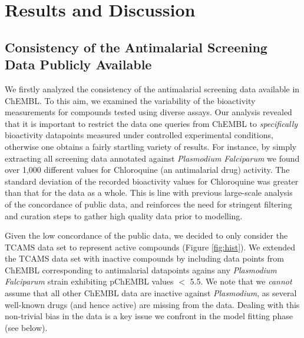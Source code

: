 \documentclass[journal=jacsat,manuscript=article]{achemso}
\begin{document}
\section*{Results and Discussion}

\subsection*{Consistency of the Antimalarial Screening Data Publicly Available}

We firstly analyzed the consistency of the antimalarial screening data available in ChEMBL. To this aim, we examined the variability of the bioactivity measurements for compounds tested using diverse assays. Our analysis revealed that it is important to restrict the data one queries from ChEMBL to \textit{specifically} bioactivity datapoints measured  under controlled experimental conditions, otherwise one obtains a fairly startling variety of results. For instance, by simply extracting all screening data annotated against \textit{Plasmodium Falciparum} we found over 1,000 different values for Chloroquine (an antimalarial drug) activity. The standard deviation of the recorded bioactivity values for Chloroquine was greater than that for the data as a whole. This is line with previous large-scale analysis of the concordance of public data\cite{Kalliokoski2013,Kalliokoski2013B,Cortes-Ciriano2015}, and reinforces the need for stringent filtering and curation steps to gather high quality data prior to modelling.


Given the low concordance of the public data, we decided to only consider the TCAMS data set to represent active compounds (Figure \ref{fig:hist}). We extended the TCAMS data set with inactive compounds by including  data points from ChEMBL corresponding to antimalarial datapoints agains any \textit{Plasmodium Falciparum} strain exhibiting pChEMBL values $<$ 5.5.
We note that we \textit{cannot} assume that all other ChEMBL data are inactive against \textit{Plasmodium}, as several well-known drugs (and hence active) are missing from the data. Dealing with this non-trivial bias in the data is a key issue we confront in the model fitting phase (see below).\newline
\end{document}
